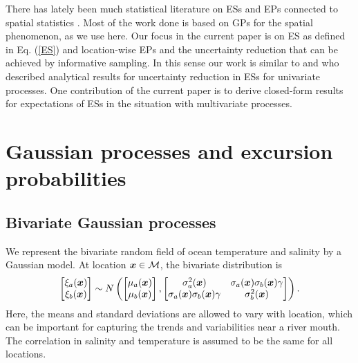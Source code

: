 \documentclass[aoas]{imsart}
\begin{document}
There has lately been much statistical literature on ESs and EPs connected to spatial statistics \citep{french2013spatio,bolin2015excursion,french2016credible}. 
Most of the work done is based on GPs for the spatial phenomenon, as we use here.
Our focus in the current paper is on ES as defined in Eq. (\ref{ES}) and location-wise EPs and the uncertainty reduction that can be achieved by informative sampling. 
In this sense our work is similar to \cite{chevalier2014fast} and \cite{azzimonti2016quantifying} who described analytical results for uncertainty reduction in ESs for univariate processes.
One contribution of the current paper is to derive closed-form results for expectations of ESs in the situation with multivariate processes.

\section{Gaussian processes and excursion probabilities}\label{sec:GP_EP}


\subsection{Bivariate Gaussian processes}

We represent the bivariate random field of ocean temperature and salinity by a Gaussian model.
At location ${\boldsymbol x} \in \mathcal{M}$, the bivariate distribution is 
\begin{equation}\label{gp_bar}
\begin{bmatrix}\xi_a(\bx) \\
\xi_b(\bx) 
\end{bmatrix}
 \sim N \left( 
\begin{bmatrix} \mu_{a}(\bx)\\
\mu_{b}(\bx)
\end{bmatrix},\begin{bmatrix}
\sigma_{a}^2(\bx) & \sigma_{a}(\bx) \sigma_b(\bx) \gamma  \\
\sigma_{a}(\bx) \sigma_b(\bx) \gamma  & \sigma_{b}^2(\bx) 
\end{bmatrix}
\right).
\end{equation}
Here, the means and standard deviations are allowed to vary with location, which can be important for capturing the trends and variabilities near a river mouth. The correlation in salinity and temperature is assumed to be the same for all locations.
\end{document}
